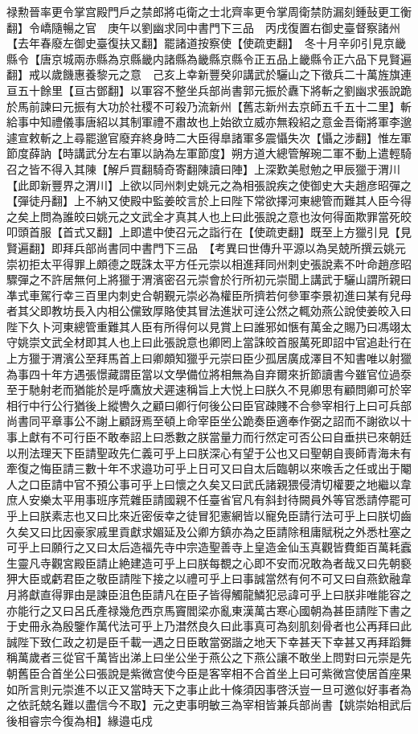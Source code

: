 禄勲晉率更令掌宫殿門戶之禁郎將屯衛之士北齊率更令掌周衛禁防漏刻鍾鼔更工衡翻】令嶠隨暢之官　庚午以劉幽求同中書門下三品　丙戌復置右御史臺督察諸州【去年春廢左御史臺復扶又翻】罷諸道按察使【使疏吏翻】　冬十月辛卯引見京畿縣令【唐京城兩赤縣為京縣畿内諸縣為畿縣京縣令正五品上畿縣令正六品下見賢遍翻】戒以歲饑惠養黎元之意　己亥上幸新豐癸卯講武於驪山之下徵兵二十萬旌旗連亘五十餘里【亘古鄧翻】以軍容不整坐兵部尚書郭元振於纛下將斬之劉幽求張說跪於馬前諫曰元振有大功於社稷不可殺乃流新州【舊志新州去京師五千五十二里】斬給事中知禮儀事唐紹以其制軍禮不肅故也上始欲立威亦無殺紹之意金吾衛將軍李邈遽宣敕斬之上尋罷邈官廢弃終身時二大臣得臯諸軍多震懾失次【懾之涉翻】惟左軍節度薛訥【時講武分左右軍以訥為左軍節度】朔方道大總管解琬二軍不動上遣輕騎召之皆不得入其陳【解戶買翻騎奇寄翻陳讀曰陣】上深歎美慰勉之甲辰獵于渭川【此即新豐界之渭川】上欲以同州刺史姚元之為相張說疾之使御史大夫趙彦昭彈之【彈徒丹翻】上不納又使殿中監姜皎言於上曰陛下常欲擇河東總管而難其人臣今得之矣上問為誰皎曰姚元之文武全才真其人也上曰此張說之意也汝何得面欺罪當死皎叩頭首服【首式又翻】上即遣中使召元之詣行在【使疏吏翻】既至上方獵引見【見賢遍翻】即拜兵部尚書同中書門下三品　【考異曰世傳升平源以為吴兢所撰云姚元崇初拒太平得罪上頗德之既誅太平方任元崇以相進拜同州刺史張說素不叶命趙彦昭驟彈之不許居無何上將獵于渭濱密召元崇會於行所初元崇聞上講武于驪山謂所親曰凖式車駕行幸三百里内刺史合朝覲元崇必為權臣所擠若何參軍李景初進曰某有兒母者其父即教坊長入内相公儻致厚賂使其冒法進狀可逹公然之輒効燕公說使姜皎入曰陛下久卜河東總管重難其人臣有所得何以見賞上曰誰邪如愜有萬金之賜乃曰馮翊太守姚崇文武全材即其人也上曰此張說意也卿罔上當誅皎首服萬死即詔中官追赴行在上方獵于渭濱公至拜馬首上曰卿頗知獵乎元崇曰臣少孤居廣成澤目不知書唯以射獵為事四十年方遇張憬藏謂臣當以文學備位將相無為自弃爾來折節讀書今雖官位過沗至于馳射老而猶能於是呼鷹放犬遲速稱旨上大悦上曰朕久不見卿思有顧問卿可於宰相行中行公行猶後上縱轡久之顧曰卿行何後公曰臣官疎賤不合參宰相行上曰可兵部尚書同平章事公不謝上顧訝焉至頓上命宰臣坐公跪奏臣適奉作弼之詔而不謝欲以十事上獻有不可行臣不敢奉詔上曰悉數之朕當量力而行然定可否公曰自垂拱已來朝廷以刑法理天下臣請聖政先仁義可乎上曰朕深心有望于公也又曰聖朝自喪師青海未有牽復之悔臣請三數十年不求邉功可乎上日可又曰自太后臨朝以來㗋舌之任或出于閹人之口臣請中官不預公事可乎上曰懷之久矣又曰武氏諸親猥侵清切權要之地繼以韋庶人安樂太平用事班序荒雜臣請國親不任臺省官凡有斜封待闕員外等官悉請停罷可乎上曰朕素志也又曰比來近密佞幸之徒冒犯憲網皆以寵免臣請行法可乎上曰朕切齒久矣又曰比因豪家戚里貢獻求媚延及公卿方鎮亦為之臣請除租庸賦税之外悉杜塞之可乎上曰願行之又曰太后造福先寺中宗造聖善寺上皇造金仙玉真觀皆費鉅百萬耗蠧生靈凡寺觀宮殿臣請止絶建造可乎上曰朕每覩之心即不安而况敢為者哉又曰先朝褻狎大臣或虧君臣之敬臣請陛下接之以禮可乎上曰事誠當然有何不可又曰自燕欽融韋月將獻直得罪由是諫臣沮色臣請凡在臣子皆得觸龍鱗犯忌諱可乎上曰朕非唯能容之亦能行之又曰呂氏產禄幾危西京馬竇閻梁亦亂東漢萬古寒心國朝為甚臣請陛下書之于史冊永為殷鑒作萬代法可乎上乃澘然良久曰此事真可為刻肌刻骨者也公再拜曰此誠陛下致仁政之初是臣千載一遇之日臣敢當弼諧之地天下幸甚天下幸甚又再拜蹈舞稱萬歲者三從官千萬皆出涕上曰坐公坐于燕公之下燕公讓不敢坐上問對曰元崇是先朝舊臣合首坐公曰張說是紫微宫使今臣是客宰相不合首坐上曰可紫微宫使居首座果如所言則元崇進不以正又當時天下之事止此十條須因事啓沃豈一旦可邀似好事者為之依託兢名難以盡信今不取】元之吏事明敏三為宰相皆兼兵部尚書【姚崇始相武后後相睿宗今復為相】緣邉屯戍